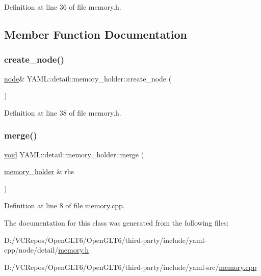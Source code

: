 Definition at line 36 of file memory.\+h.



\subsection{Member Function Documentation}
\mbox{\label{class_y_a_m_l_1_1detail_1_1memory__holder_afd6ca5191dffb5f3b30f80f7f6d63573}} 
\subsubsection{\texorpdfstring{create\_node()}{create\_node()}}
{\footnotesize\ttfamily \mbox{\hyperlink{class_y_a_m_l_1_1detail_1_1node}{node}}\& Y\+A\+M\+L\+::detail\+::memory\+\_\+holder\+::create\+\_\+node (\begin{DoxyParamCaption}{ }\end{DoxyParamCaption})\hspace{0.3cm}{\ttfamily [inline]}}



Definition at line 38 of file memory.\+h.

\mbox{\label{class_y_a_m_l_1_1detail_1_1memory__holder_a3df3dee52c6c3432bb77f3b966a6744f}} 
\subsubsection{\texorpdfstring{merge()}{merge()}}
{\footnotesize\ttfamily \mbox{\hyperlink{glad_8h_a950fc91edb4504f62f1c577bf4727c29}{void}} Y\+A\+M\+L\+::detail\+::memory\+\_\+holder\+::merge (\begin{DoxyParamCaption}\item[{\mbox{\hyperlink{class_y_a_m_l_1_1detail_1_1memory__holder}{memory\+\_\+holder}} \&}]{rhs }\end{DoxyParamCaption})}



Definition at line 8 of file memory.\+cpp.



The documentation for this class was generated from the following files\+:\begin{DoxyCompactItemize}
\item 
D\+:/\+V\+C\+Repos/\+Open\+G\+L\+T6/\+Open\+G\+L\+T6/third-\/party/include/yaml-\/cpp/node/detail/\mbox{\hyperlink{memory_8h}{memory.\+h}}\item 
D\+:/\+V\+C\+Repos/\+Open\+G\+L\+T6/\+Open\+G\+L\+T6/third-\/party/include/yaml-\/src/\mbox{\hyperlink{memory_8cpp}{memory.\+cpp}}\end{DoxyCompactItemize}
